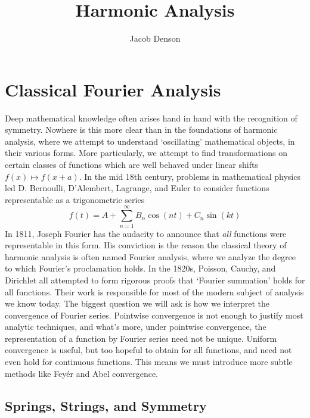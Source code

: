 

\DeclareMathOperator{\Dom}{Dom}

\title{Harmonic Analysis}
\author{Jacob Denson}




\maketitle

\tableofcontents


\part{Classical Fourier Analysis}

Deep mathematical knowledge often arises hand in hand with the recognition of symmetry. Nowhere is this more clear than in the foundations of harmonic analysis, where we attempt to understand `oscillating' mathematical objects, in their various forms. More particularly, we attempt to find transformations on certain classes of functions which are well behaved under linear shifts $f(x) \mapsto f(x + a)$. In the mid 18th century, problems in mathematical physics led D. Bernoulli, D'Alembert, Lagrange, and Euler to consider functions representable as a trigonometric series
%
\[ f(t) = A + \sum_{n = 1}^\infty B_n \cos(nt) + C_n \sin(kt) \]
%
In 1811, Joseph Fourier has the audacity to announce that {\it all} functions were representable in this form. His conviction is the reason the classical theory of harmonic analysis is often named Fourier analysis, where we analyze the degree to which Fourier's proclamation holds. In the 1820s, Poisson, Cauchy, and Dirichlet all attempted to form rigorous proofs that `Fourier summation' holds for all functions. Their work is responsible for most of the modern subject of analysis we know today. The biggest question we will ask is how we interpret the convergence of Fourier series. Pointwise convergence is not enough to justify most analytic techniques, and what's more, under pointwise convergence, the representation of a function by Fourier series need not be unique. Uniform convergence is useful, but too hopeful to obtain for all functions, and need not even hold for continuous functions. This means we must introduce more subtle methods like Fey\'{e}r and Abel convergence.

\chapter{Springs, Strings, and Symmetry}

